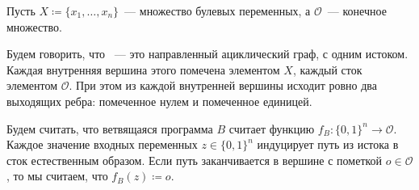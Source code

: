 \begin{definition*}
    Пусть $X \coloneqq \{x_1, \dots, x_n\}$~--- множество булевых переменных, а $\mathcal{O}$~---
    конечное множество.
    
    Будем говорить, что ~--- это направленный ациклический граф, с одним
    истоком. Каждая внутренняя вершина этого помечена элементом $X$, каждый сток элементом
    $\mathcal{O}$. При этом из каждой внутренней вершины исходит ровно два выходящих ребра: помеченное
    нулем и помеченное единицей.

    Будем считать, что ветвящаяся программа $B$ считает функцию $f_{B}\colon \{0, 1\}^n \to
    \mathcal{O}$. Каждое значение входных переменных $z \in \{0, 1\}^n$ индуцирует путь из истока в сток
    естественным образом. Если путь заканчивается в вершине с пометкой $o \in \mathcal{O}$, то мы
    считаем, что $f_B(z) \coloneqq o$.
\end{definition*}

